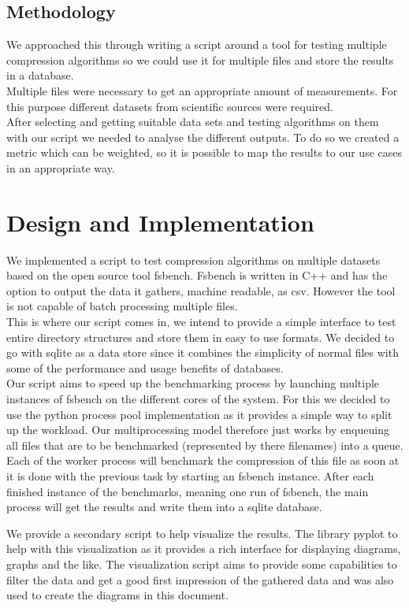 \documentclass[
	12pt,
	a4paper,
	BCOR10mm,
	DIV14,
	listof=totoc,
	bibliography=totoc,
	headsepline
]{scrreprt}
\begin{document}
\section*{Methodology}
We approached this through writing a script around a tool for testing multiple compression algorithms so we could use it for multiple files and store the results in a database. 
\\
Multiple files were necessary to get an appropriate amount of measurements.
For this purpose different datasets from scientific sources were required.
\\
After selecting and getting suitable data sets and testing algorithms on them with our script we needed to analyse the different outputs.
To do so we created a metric which can be weighted, so it is possible to map the results to our use cases in an appropriate way. \\

\chapter{Design and Implementation}
\label{Design}
We implemented a script to test compression algorithms on multiple datasets based on the open source tool fsbench. 
Fsbench is written in C++ and has the option to output the data it gathers, machine readable, as csv.
However the tool is not capable of batch processing multiple files. \\
This is where our script comes in, we intend to provide a simple interface to test entire directory structures and store them in easy to use formats.
We decided to go with sqlite as a data store since it combines the simplicity of normal files with some of the performance and usage benefits of databases. \\
Our script aims to speed up the benchmarking process by launching multiple instances of fsbench on the different cores of the system.
For this we decided to use the python process pool implementation as it provides a simple way to split up the workload.
Our multiprocessing model therefore just works by enqueuing all files that are to be benchmarked (represented by there filenames) into a queue.
Each of the worker process will benchmark the compression of this file as soon at it is done with the previous task by starting an fsbench instance.
After each finished instance of the benchmarks, meaning one run of fsbench, the main process will get the results and write them into a sqlite database.


We provide a secondary script to help visualize the results. 
The library pyplot to help with this visualization as it provides a rich interface for displaying diagrams, graphs and the like.
The visualization script aims to provide some capabilities to filter the data and get a good first impression of the gathered data and was also used to create the diagrams in this document.
\end{document}
